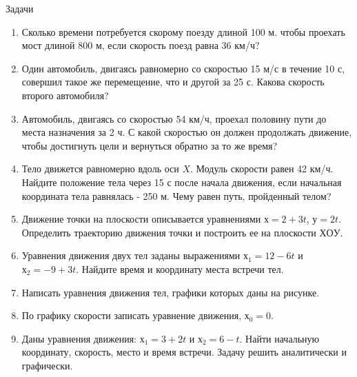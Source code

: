 \documentclass[a6paper, 11pt]{diss_4}
\renewcommand{\'}{\,'}
\begin{document}
\begin{center}
   Задачи
\end{center}
\begin{enumerate}
\item Сколько времени потребуется скорому поезду длиной 100 м. чтобы проехать
мост длиной 800 м, если скорость поезд равна 36 км/ч?

\item Один автомобиль, двигаясь равномерно со скоростью 15 м/с в течение 10 с,
совершил такое же перемещение, что и другой за 25 с. Какова скорость второго автомобиля?

\item Автомобиль, двигаясь со скоростью 54 км/ч, проехал половину пути до места
назначения за 2 ч. С какой скоростью он должен продолжать движение, чтобы
достигнуть цели и вернуться обратно за то же время?

\item Тело движется равномерно вдоль оси $X$. Модуль скорости равен 42 км/ч.
Найдите положение тела через 15 с после начала движения, если начальная
координата тела равнялась - 250 м. Чему равен путь, пройденный телом?

\item Движение точки на плоскости описывается уравнениями $х = 2 + 3t$, $у = 2t$.
Определить траекторию движения точки и построить ее на плоскости $ХОУ$.

\item Уравнения движения двух тел заданы выражениями $х_1 = 12 - 6t$ и
$х_2 = -9 + 3t$. Найдите время и координату места встречи тел.

\item Написать уравнения движения тел, графики которых даны на рисунке.

\item По графику скорости записать уравнение движения, $х_0=0$.


\item Даны уравнения движения: $х_1 = 3 +2t$ и $х_2 = 6 - t$. Найти начальную
координату, скорость, место и время встречи. Задачу решить аналитически и
графически.
\end{enumerate}
\end{document}
